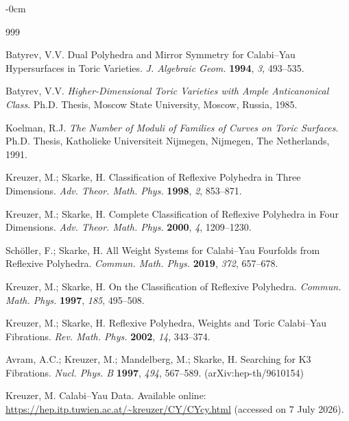 \documentclass[appliedmath,article,submit,moreauthors]{Definitions/mdpi}
\begin{document}
\begin{adjustwidth}{-\extralength}{0cm}


\begin{thebibliography}{999}

Batyrev, V.V.
Dual Polyhedra and Mirror Symmetry for Calabi--Yau Hypersurfaces in Toric Varieties.
\textit{J. Algebraic Geom.} \textbf{1994}, \textit{3}, 493--535.

Batyrev, V.V.
\textit{Higher-Dimensional Toric Varieties with Ample Anticanonical Class}.
Ph.D. Thesis, Moscow State University, Moscow, Russia, 1985.

Koelman, R.J.
\textit{The Number of Moduli of Families of Curves on Toric Surfaces}.
Ph.D. Thesis, Katholieke Universiteit Nijmegen, Nijmegen, The Netherlands, 1991.

Kreuzer, M.; Skarke, H.
Classification of Reflexive Polyhedra in Three Dimensions.
\textit{Adv. Theor. Math. Phys.} \textbf{1998}, \textit{2}, 853--871.

Kreuzer, M.; Skarke, H.
Complete Classification of Reflexive Polyhedra in Four Dimensions.
\textit{Adv. Theor. Math. Phys.} \textbf{2000}, \textit{4}, 1209--1230.

Sch{\"o}ller, F.; Skarke, H.
All Weight Systems for Calabi--Yau Fourfolds from Reflexive Polyhedra.
\textit{Commun. Math. Phys.} \textbf{2019}, \textit{372}, 657--678.

Kreuzer, M.; Skarke, H.
On the Classification of Reflexive Polyhedra.
\textit{Commun. Math. Phys.} \textbf{1997}, \textit{185}, 495--508.

Kreuzer, M.; Skarke, H.
Reflexive Polyhedra, Weights and Toric Calabi--Yau Fibrations.
\textit{Rev. Math. Phys.} \textbf{2002}, \textit{14}, 343--374.

{\color{blue}
Avram, A.C.; Kreuzer, M.; Mandelberg, M.; Skarke, H.
Searching for K3 Fibrations.
\textit{Nucl. Phys. B} \textbf{1997}, \textit{494}, 567--589.
(arXiv:hep-th/9610154)
}

Kreuzer, M.
Calabi--Yau Data.
Available online: \url{https://hep.itp.tuwien.ac.at/~kreuzer/CY/CYcy.html}
(accessed on 7 July 2026).


\end{thebibliography}
\end{adjustwidth}
\end{document}
